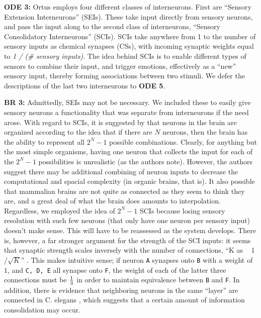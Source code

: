 \documentclass[letterpaper]{article}
\begin{document}
\textbf{ODE 3:} Ortus employs four different classes of interneurons. First are ``Sensory Extension Interneurons'' (SEIs). These take input directly from sensory neurons, and pass the input along to the second class of interneurons, ``Sensory Consolidatory Interneurons'' (SCIs).
SCIs take anywhere from 1 to the number of sensory inputs as chemical synapses (CSs), with incoming synaptic weights equal to \textit{1 / (\# sensory inputs)}.
The idea behind SCIs is to enable different types of sensors to combine their input, and trigger emotions, effectively as a ``new'' sensory input, thereby forming associations between two stimuli. We defer the descriptions of the last two interneurons to \textbf{ODE 5}.

\textbf{BR 3:} Admittedly, SEIs may not be necessary. We included these to easily give sensory neurons a functionality that was separate from interneurons if the need arose. With regard to SCIs, it is suggested by \citet{Xie2016} that neurons in the brain are organized according to the idea that if there are $N$ neurons, then the brain has the ability to represent all $2^N-1$ possible combinations.
Clearly, for anything but the most simple organisms, having one neuron that collects the input for each of the $2^N-1$ possibilities is unrealistic (as the authors note).
However, the authors suggest there may be additional combining of neuron inputs to decrease the computational and spacial complexity (in organic brains, that is).
It also possible that mammalian brains are not quite as connected as they seem to think they are, and a great deal of what the brain does amounts to interpolation.
Regardless, we employed the idea of $2^N-1$ SCIs because losing sensory resolution with such few neurons (that only have one neuron per sensory input) doesn't make sense.
This will have to be reassessed as the system develops.
There is, however, a far stronger argument for the strength of the SCI inputs: it seems that synaptic strength scales inversely with the number of connections, ``K as ~ 1 /$\sqrt{K}$'' \citep{Barral2016}. This makes intuitive sense; if neuron \texttt{A} synapses onto \texttt{B} with a weight of $1$, and \texttt{C, D, E} all synapse onto \texttt{F}, the weight of each of the latter three connections must be $1 \over 3$ in order to maintain equivalence between \texttt{B} and \texttt{F}. In addition, there is evidence that neighboring neurons in the same ``layer'' are connected in C. elegans \citep{Azulay2016}, which suggests that a certain amount of information consolidation may occur.
\end{document}
